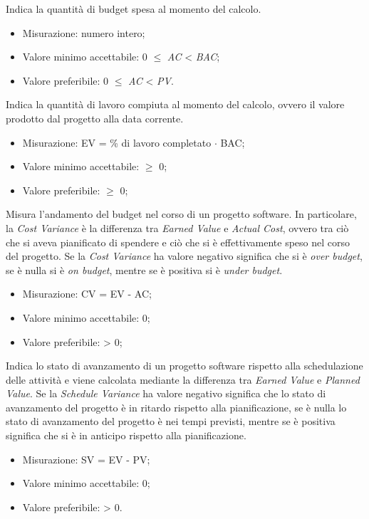 		Indica la quantità di budget spesa al momento del calcolo.
		\begin{itemize}
			\item{Misurazione: numero intero;}
			\item{Valore minimo accettabile: 0 $\leq$ \textit{AC} < \textit{BAC};}
			\item{Valore preferibile: 0 $\leq$ \textit{AC} < \textit{PV}.}
		\end{itemize}
		
		Indica la quantità di lavoro compiuta al momento del calcolo, ovvero il valore prodotto dal progetto alla data corrente.
		\begin{itemize}
			\item{Misurazione: EV =  \% di lavoro completato $\cdot$ BAC;}
			\item{Valore minimo accettabile: $\geq$ 0;}
			\item{Valore preferibile: $\geq$ 0;}
		\end{itemize}

		Misura l'andamento del budget nel corso di un progetto software. In particolare, la \textit{Cost Variance} è la differenza tra \textit{Earned Value} e \textit{Actual Cost}, ovvero tra ciò che si aveva pianificato di spendere e ciò che si è effettivamente speso nel corso del progetto.
		Se la \textit{Cost Variance} ha valore negativo significa che si è \textit{over budget}, se è nulla si è \textit{on budget}, mentre se è positiva si è \textit{under budget}.
		\begin{itemize}
			\item{Misurazione: CV = EV - AC;}
			\item{Valore minimo accettabile: 0;}
			\item{Valore preferibile: > 0;}
		\end{itemize}
		
		Indica lo stato di avanzamento di un progetto software rispetto alla schedulazione delle attività e viene calcolata mediante la differenza tra \textit{Earned Value} e \textit{Planned Value}.
		Se la \textit{Schedule Variance} ha valore negativo significa che lo stato di avanzamento del progetto è in ritardo rispetto alla pianificazione, se è nulla lo stato di avanzamento del progetto è nei tempi previsti, mentre se è positiva significa che si è in anticipo rispetto alla pianificazione.
		\begin{itemize}
			\item{Misurazione: SV = EV - PV;}
			\item{Valore minimo accettabile: 0;}
			\item{Valore preferibile: > 0.}
		\end{itemize}
						
